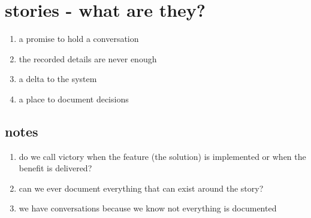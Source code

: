 \section*{stories - what are they?}
\begin{enumerate}
\item a promise to hold a conversation
\item the recorded details are never enough
\item a delta to the system
\item a place to document decisions
\end{enumerate}
\subsection*{notes}
\begin{enumerate}
\item do we call victory when the feature (the solution) is implemented or when the benefit is delivered?
\item can we ever document everything that can exist around the story?
\item we have conversations because we know not everything is documented
\end{enumerate}
